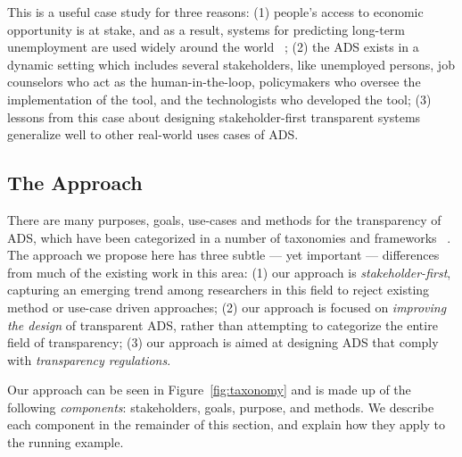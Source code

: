 This is a useful case study for three reasons: (1) people's access to economic opportunity is at stake, and as a result, systems for predicting long-term unemployment are used widely around the world ~\cite{platform2018tackling, sztandar2018changing, loxha2014profiling, matty2013predicting, riipinen2011risk, caswell2010unemployed}; (2) the ADS exists in a dynamic setting which includes several stakeholders, like unemployed persons, job counselors who act as the human-in-the-loop, policymakers who oversee the implementation of the tool, and the technologists who developed the tool; (3) lessons from this case about designing stakeholder-first transparent systems generalize well to other real-world uses cases of ADS.

\subsection{The Approach}
\label{sec:approach}

There are many purposes, goals, use-cases and methods for the transparency of ADS, which have been categorized in a number of taxonomies and frameworks ~\cite{DBLP:journals/jmlr/AryaBCDHHHLLMMP20, ventocilla2018towards, DBLP:journals/corr/abs-2012-01805, molnar2019, meske, DBLP:conf/chi/LiaoGM20, rodolfa2020machine, richards2021human, DBLP:journals/corr/abs-2001-09734}. The  approach we propose here has three subtle --- yet important --- differences from much of the existing work in this area: (1) our approach is \emph{stakeholder-first}, capturing an emerging trend among researchers in this field to reject existing method or use-case driven approaches; (2) our approach is focused on \emph{improving the design} of transparent ADS, rather than attempting to categorize the entire field of transparency; (3) our approach is aimed at designing ADS that comply with \emph{transparency regulations}.

Our approach can be seen in Figure~\ref{fig:taxonomy} and is made up of the following \emph{components}: stakeholders, goals, purpose, and methods. We describe each component in the remainder of this section, and explain how they apply to the running example.


